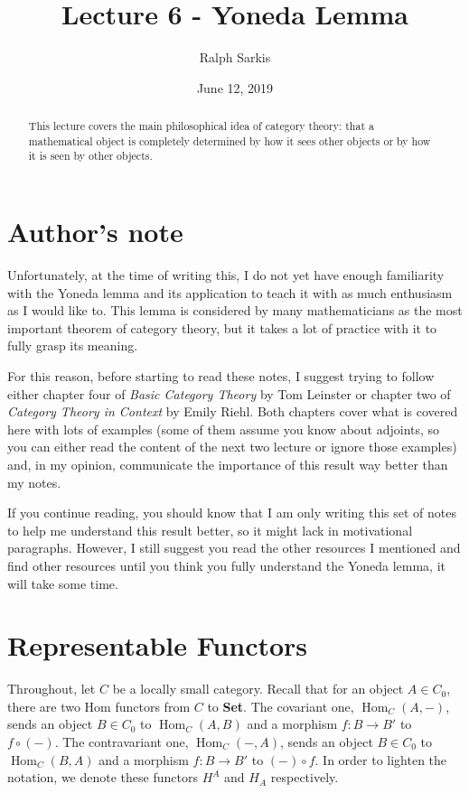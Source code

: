 \documentclass{article}
\title{Lecture 6 - Yoneda Lemma\vspace{-10pt}}
\author{Ralph Sarkis}
\date{\vspace{-10pt}June 12, 2019\vspace{-15pt}}  %
\theoremstyle{definition}
\theoremstyle{remark}
\DeclareMathOperator{\Hom}{Hom}
\begin{document}
\maketitle
\begin{abstract} This lecture covers the main philosophical idea of category theory: that a mathematical object is completely determined by how it sees other objects or by how it is seen by other objects.
\end{abstract}
\setcounter{section}{-1}
\section{Author's note}
Unfortunately, at the time of writing this, I do not yet have enough familiarity with the Yoneda lemma and its application to teach it with as much enthusiasm as I would like to. This lemma is considered by many mathematicians as the most important theorem of category theory, but it takes a lot of practice with it to fully grasp its meaning.

For this reason, before starting to read these notes, I suggest trying to follow either chapter four of \textit{Basic Category Theory} by Tom Leinster or chapter two of \textit{Category Theory in Context} by Emily Riehl. Both chapters cover what is covered here with lots of examples (some of them assume you know about adjoints, so you can either read the content of the next two lecture or ignore those examples) and, in my opinion, communicate the importance of this result way better than my notes.

If you continue reading, you should know that I am only writing this set of notes to help me understand this result better, so it might lack in motivational paragraphs. However, I still suggest you read the other resources I mentioned and find other resources until you think you fully understand the Yoneda lemma, it will take some time.
\section{Representable Functors}
Throughout, let $C$ be a locally small category. Recall that for an object $A \in C_0$, there are two Hom functors from $C$ to \textbf{Set}. The covariant one, $\Hom_C(A, -)$, sends an object $B \in C_0$ to $\Hom_C(A,B)$ and a morphism $f:B\rightarrow B'$ to $f \circ (-)$. The contravariant one, $\Hom_C(-,A)$, sends an object $B \in C_0$ to $\Hom_C(B,A)$ and a morphism $f: B\rightarrow B'$ to $(-) \circ f$. In order to lighten the notation, we denote these functors $H^A$ and $H_A$ respectively.
\end{document}
